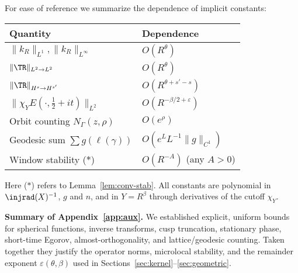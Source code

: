 For ease of reference we summarize the dependence of implicit constants:
\begin{center}
\begin{tabular}{l|l}
Quantity & Dependence \\ \hline
$\|k_R\|_{L^1},\|k_R\|_{L^\infty}$ & $O(R^\theta)$ \\
$\|\TR\|_{L^2\to L^2}$ & $O(R^\theta)$ \\
$\|\TR\|_{H^s\to H^{s'}}$ & $O(R^{\theta+s'-s})$ \\
$\|\chi_Y E(\cdot,\tfrac12+it)\|_{L^2}$ & $O(R^{-\beta/2+\varepsilon})$ \\
Orbit counting $N_\Gamma(z,\rho)$ & $O(e^{\rho})$ \\
Geodesic sum $\sum g(\ell(\gamma))$ & $O(e^{L}L^{-1}\|g\|_{C^1})$ \\
Window stability ($*$) & $O(R^{-\!A})$ (any $A>0$) \\
\end{tabular}
\end{center}
Here ($*$) refers to Lemma~\ref{lem:conv-stab}. All constants are
polynomial in $\injrad(X)^{-1}$, $g$ and $n$, and in $Y=R^\beta$ through derivatives
of the cutoff $\chi_Y$.

\bigskip
\noindent\textbf{Summary of Appendix~\ref{app:aux}.}
We established explicit, uniform bounds for spherical functions,
inverse transforms, cusp truncation, stationary phase,
short-time Egorov, almost-orthogonality, and lattice/geodesic counting.
Taken together they justify the operator norms, microlocal stability,
and the remainder exponent $\varepsilon(\theta,\beta)$ used in
Sections~\ref{sec:kernel}–\ref{sec:geometric}.
